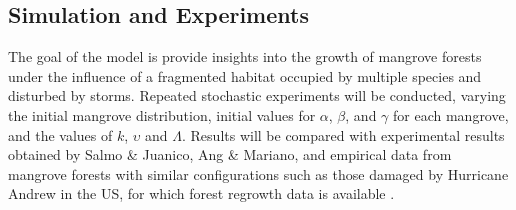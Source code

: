\subsection{Simulation and Experiments}
The goal of the model is provide insights into the growth of mangrove forests under the influence of a fragmented habitat occupied by multiple species and disturbed by storms. Repeated stochastic experiments will be conducted, varying the initial mangrove distribution, initial values for $\alpha$, $\beta$, and $\gamma$ for each mangrove, and the values of $k$, $\upsilon$ and $\Lambda$. Results will be compared with experimental results obtained by Salmo \& Juanico, Ang \& Mariano, and empirical data from mangrove forests with similar configurations such as those damaged by Hurricane Andrew in the US, for which forest regrowth data is available \cite{baldwinMangroveRegeneration}.